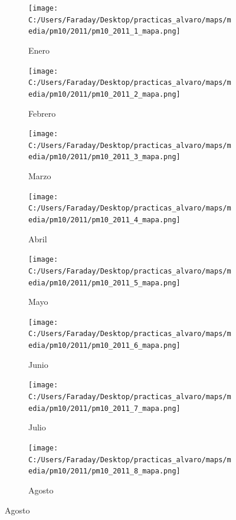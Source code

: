 \documentclass[12pt]{beamer}
\begin{document}
\begin{frame}[squeeze]
\tiny
\begin{figure}[H]
\centering
\begin{subfigure}[H]{0.20\textwidth}
\texttt{[image: C:/Users/Faraday/Desktop/practicas\_alvaro/maps/media/pm10/2011/pm10\_2011\_1\_mapa.png]}
\captionsetup{labelformat=empty}
\caption{\scriptsize Enero}
\label{fig:map-pm10-2011-1}
\end{subfigure}
%
\begin{subfigure}[H]{0.20\textwidth}
\texttt{[image: C:/Users/Faraday/Desktop/practicas\_alvaro/maps/media/pm10/2011/pm10\_2011\_2\_mapa.png]}
\captionsetup{labelformat=empty}
\caption{\scriptsize Febrero}
\label{fig:map-pm10-2011-2}
\end{subfigure}
%
\begin{subfigure}[H]{0.20\textwidth}
\texttt{[image: C:/Users/Faraday/Desktop/practicas\_alvaro/maps/media/pm10/2011/pm10\_2011\_3\_mapa.png]}
\captionsetup{labelformat=empty}
\caption{\scriptsize Marzo}
\label{fig:map-pm10-2011-3}
\end{subfigure}
%
\begin{subfigure}[H]{0.20\textwidth}
\texttt{[image: C:/Users/Faraday/Desktop/practicas\_alvaro/maps/media/pm10/2011/pm10\_2011\_4\_mapa.png]}
\captionsetup{labelformat=empty}
\caption{\scriptsize Abril}
\label{fig:map-pm10-2011-4}
\end{subfigure}

\begin{subfigure}[H]{0.20\textwidth}
\texttt{[image: C:/Users/Faraday/Desktop/practicas\_alvaro/maps/media/pm10/2011/pm10\_2011\_5\_mapa.png]}
\captionsetup{labelformat=empty}
\caption{\scriptsize Mayo}
\label{fig:map-pm10-2011-5}
\end{subfigure}
%
\begin{subfigure}[H]{0.20\textwidth}
\texttt{[image: C:/Users/Faraday/Desktop/practicas\_alvaro/maps/media/pm10/2011/pm10\_2011\_6\_mapa.png]}
\captionsetup{labelformat=empty}
\caption{\scriptsize Junio}
\label{fig:map-pm10-2011-6}
\end{subfigure}
%
\begin{subfigure}[H]{0.20\textwidth}
\texttt{[image: C:/Users/Faraday/Desktop/practicas\_alvaro/maps/media/pm10/2011/pm10\_2011\_7\_mapa.png]}
\captionsetup{labelformat=empty}
\caption{\scriptsize Julio}
\label{fig:map-pm10-2011-7}
\end{subfigure}
%
\begin{subfigure}[H]{0.20\textwidth}
\texttt{[image: C:/Users/Faraday/Desktop/practicas\_alvaro/maps/media/pm10/2011/pm10\_2011\_8\_mapa.png]}
\captionsetup{labelformat=empty}
\caption{\scriptsize Agosto}
\label{fig:map-pm10-2011-8}
\end{subfigure}


\end{figure}
\end{frame}
\end{document}
